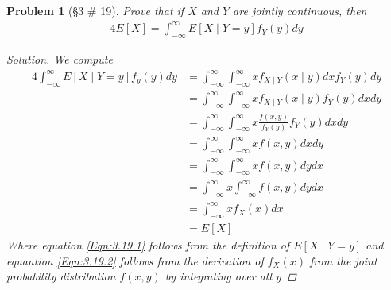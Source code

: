 \documentclass[11pt, oneside]{book}   	%
\newtheorem{problem}{Problem}[chapter]
\begin{document}
\begin{problem}[\S 3 \# 19]
	Prove that if $X$ and $Y$ are jointly continuous, then 
	\begin{alignat}{4}
		E[X]=\int_{-\infty}^\infty E[X\mid Y=y]f_Y(y)dy
	\end{alignat}
	\begin{proof}[Solution]
		We compute
		\begin{alignat}{4}
			\int_{-\infty}^\infty E[X\mid Y=y]f_y(y)dy&=\int_{-\infty}^\infty \int_{-\infty}^\infty xf_{X\mid Y}(x\mid y)dx f_Y(y) dy \label{Eqn:3.19.1} \\
				&=\int_{-\infty}^\infty \int_{-\infty}^\infty x f_{X\mid Y}(x\mid y)f_Y(y)dx dy \\
				&=\int_{-\infty}^\infty \int_{-\infty}^\infty x \frac{f(x, y)}{f_Y(y)} f_Y(y) dx dy \\
				&=\int_{-\infty}^\infty \int_{-\infty}^\infty x f(x, y) dx dy \\
				&=\int_{-\infty}^\infty \int_{-\infty}^\infty x f(x, y) dy dx \\
				&=\int_{-\infty}^\infty x \int_{-\infty}^\infty f(x, y) dy dx \\
				&=\int_{-\infty}^\infty x f_X(x) dx \label{Eqn:3.19.2} \\ 
				&=E[X]
		\end{alignat}
		Where equation \ref{Eqn:3.19.1} follows from the definition of $E[X\mid Y=y]$ and equantion \ref{Eqn:3.19.2} follows from the derivation of $f_X(x)$ from the joint probability distribution $f(x, y)$ by integrating over all $y$
	\end{proof}
\end{problem}

\clearpage
{}
\printindex
\end{document}
